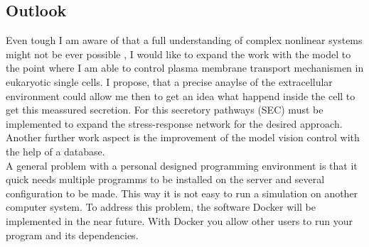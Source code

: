 \subsection{Outlook}
Even tough I am aware of that a full understanding of complex nonlinear systems might not be ever possible \cite{Noell2018}, 
I would like to expand the work with the model to the point where I am able to control plasma membrane transport mechanismen in eukaryotic single cells. I propose, that a precise anaylse of the extracellular environment could allow me then to get an idea what happend inside the cell to get this meassured secretion. For this secretory pathways (SEC) must be implemented to expand the stress-response network for the desired approach.\\
Another further work aspect is the improvement of the model vision control with the help of a database. \\
A general problem with a personal designed programming environment is that it quick needs multiple programms to be installed on the server and several configuration to be made. This way it is not easy to run a simulation on another computer system. To address this problem, the software Docker will be implemented in the near future. With Docker you allow other users to run your program and its dependencies. \\\\
